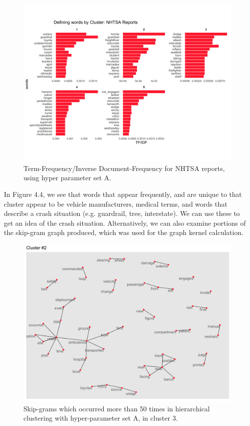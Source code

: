 \begin{figure}
\includegraphics[width=6in]{Content/Images/nhtsa_tf_idf.png}
\caption{Term-Frequency/Inverse Document-Frequency for NHTSA reports, using hyper parameter set A.}
\end{figure}

In Figure 4.4, we see that words that appear frequently, and are unique to that cluster appear to be vehicle manufacturers, medical terms, and words that describe a crash situation (e.g. guardrail, tree, interstate). We can use these to get an idea of the crash situation. Alternatively, we can also examine portions of the skip-gram graph produced, which was used for the graph kernel calculation. \\

\begin{figure}
\includegraphics[width=6in]{Content/Images/graph_k5_2.png}
\caption{Skip-grams which occurred more than 50 times in hierarchical clustering with hyper-parameter set A, in cluster 3.}
\end{figure}

